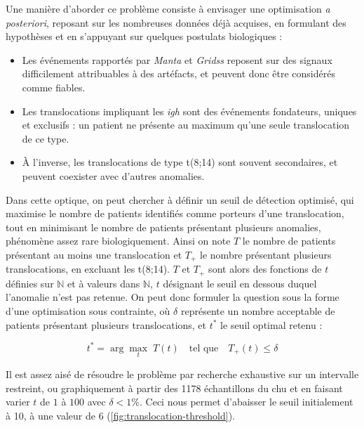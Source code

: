 Une manière d'aborder ce problème consiste à envisager une optimisation
\textit{a posteriori}, reposant sur les nombreuses données déjà acquises, en
formulant des hypothèses et en s'appuyant sur quelques postulats biologiques :

\begin{itemize}
    \item Les événements rapportés par \textit{Manta} et \textit{Gridss}
          reposent sur des signaux difficilement attribuables à des artéfacts,
          et peuvent donc être considérés comme fiables.
    \item Les translocations impliquant les \textit{\gls{igh}} sont des
          événements fondateurs, uniques et exclusifs : un patient ne présente
          au maximum qu'une seule translocation de ce type.
    \item À l'inverse, les translocations de type t(8;14) sont souvent
          secondaires, et peuvent coexister avec d'autres anomalies.
\end{itemize}

Dans cette optique, on peut chercher à définir un seuil de détection optimisé,
qui maximise le nombre de patients identifiés comme porteurs d'une
translocation, tout en minimisant le nombre de patients présentant plusieurs
anomalies, phénomène assez rare biologiquement. Ainsi on note $T$ le nombre de
patients présentant au moins une translocation et $T_{+}$ le nombre présentant
plusieurs translocations, en excluant les t(8;14). $T$ et $T_{+}$ sont alors
des fonctions de $t$ définies sur $\mathbb{N}$ et à valeurs dans $\mathbb{N}$,
$t$ désignant le seuil en dessous duquel l'anomalie n'est pas retenue. On peut
donc formuler la question sous la forme d'une optimisation sous contrainte, où
$\delta$ représente un nombre acceptable de patients présentant plusieurs
translocations, et $t^*$ le seuil optimal retenu :

\begin{equation}
    t^* = \arg\max_{t} \; T(t) \quad \text{tel que} \quad T_{+}(t) \leq \delta
\end{equation}

Il est assez aisé de résoudre le problème par recherche exhaustive sur un
intervalle restreint, ou graphiquement à partir des 1178 échantillons du
\gls{chu} et en faisant varier $t$ de $1$ à $100$ avec $\delta < 1 \%$. Ceci
nous permet d'abaisser le seuil initialement à 10, à une valeur de 6
(\autoref{fig:translocation-threshold}).



